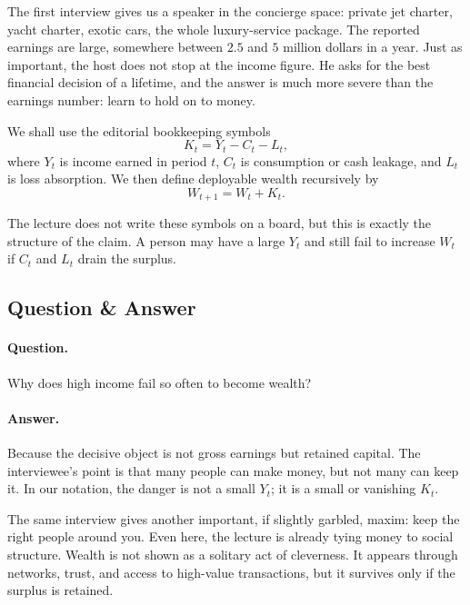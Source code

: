 The first interview gives us a speaker in the concierge space: private jet charter, yacht charter, exotic cars, the whole luxury-service package. The reported earnings are large, somewhere between \(2.5\) and \(5\) million dollars in a year. Just as important, the host does not stop at the income figure. He asks for the best financial decision of a lifetime, and the answer is much more severe than the earnings number: learn to hold on to money.

\begin{definition}
We shall use the editorial bookkeeping symbols
\begin{equation}
K_t = Y_t - C_t - L_t,
\end{equation}
where \(Y_t\) is income earned in period \(t\), \(C_t\) is consumption or cash leakage, and \(L_t\) is loss absorption. We then define deployable wealth recursively by
\begin{equation}
W_{t+1}=W_t+K_t.
\end{equation}
\end{definition}

The lecture does not write these symbols on a board, but this is exactly the structure of the claim. A person may have a large \(Y_t\) and still fail to increase \(W_t\) if \(C_t\) and \(L_t\) drain the surplus.

\subsection{Question \& Answer}

\paragraph{Question.} Why does high income fail so often to become wealth?

\paragraph{Answer.} Because the decisive object is not gross earnings but retained capital. The interviewee's point is that many people can make money, but not many can keep it. In our notation, the danger is not a small \(Y_t\); it is a small or vanishing \(K_t\).

The same interview gives another important, if slightly garbled, maxim: keep the right people around you. Even here, the lecture is already tying money to social structure. Wealth is not shown as a solitary act of cleverness. It appears through networks, trust, and access to high-value transactions, but it survives only if the surplus is retained.

